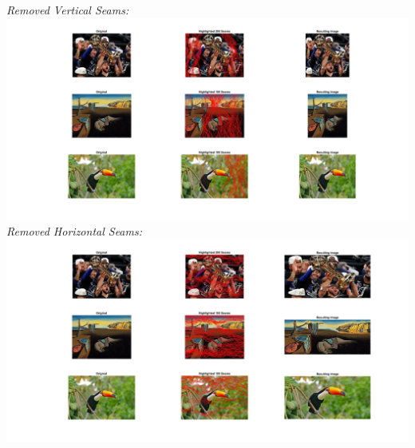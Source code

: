 \documentclass[11pt]{article}
\begin{document}
    \textit{Removed Vertical Seams:}\newline
    \includegraphics[width=\linewidth]{Part 2 Pictures/question5-vertical}\newline
    \textit{Removed Horizontal Seams:}\newline
    \includegraphics[width=\linewidth]{Part 2 Pictures/question5-horizontal}\newline
\end{document}
